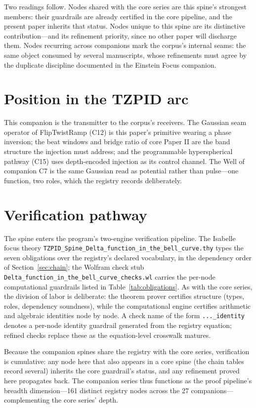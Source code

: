 \documentclass[11pt]{article}
\theoremstyle{remark}
\begin{document}
Two readings follow. Nodes shared with the core series are this spine's strongest members: their guardrails are already certified in the core pipeline, and the present paper inherits that status. Nodes unique to this spine are its distinctive contribution---and its refinement priority, since no other paper will discharge them. Nodes recurring across companions mark the corpus's internal seams: the same object consumed by several manuscripts, whose refinements must agree by the duplicate discipline documented in the Einstein Focus companion.

\section{Position in the TZPID arc}
\label{sec:arc}

This companion is the transmitter to the corpus's receivers. The Gaussian seam operator of FlipTwistRamp (C12) is this paper's primitive wearing a phase inversion; the beat windows and bridge ratio of core Paper II are the band structure the injection must address; and the programmable hyperspherical pathway (C15) uses depth-encoded injection as its control channel. The Well of companion C7 is the same Gaussian read as potential rather than pulse---one function, two roles, which the registry records deliberately.

\section{Verification pathway}
\label{sec:verify}

The spine enters the program's two-engine verification pipeline. The Isabelle focus theory \texttt{TZPID\_Spine\_Delta\_function\_in\_the\_bell\_curve.thy} types the seven obligations over the registry's declared vocabulary, in the dependency order of Section~\ref{sec:chain}; the Wolfram check stub \texttt{Delta\_function\_in\_the\_bell\_curve\_checks.wl} carries the per-node computational guardrails listed in Table~\ref{tab:obligations}. As with the core series, the division of labor is deliberate: the theorem prover certifies structure (types, roles, dependency soundness), while the computational engine certifies arithmetic and algebraic identities node by node. A check name of the form \texttt{...\_identity} denotes a per-node identity guardrail generated from the registry equation; refined checks replace these as the equation-level crosswalk matures.

Because the companion spines share the registry with the core series, verification is cumulative: any node here that also appears in a core spine (the chain tables record several) inherits the core guardrail's status, and any refinement proved here propagates back. The companion series thus functions as the proof pipeline's breadth dimension---161 distinct registry nodes across the 27 companions---complementing the core series' depth.
\end{document}
